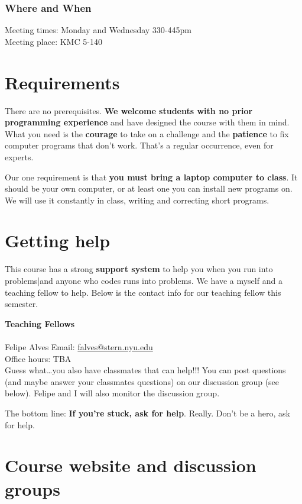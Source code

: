 \subsubsection*{Where and When}
Meeting times: Monday and Wednesday 330-445pm\\

Meeting place: KMC 5-140

\section*{Requirements}

There are no prerequisites.
{\bf We welcome students with no prior programming experience\/}
and have designed the course with them in mind.
What you need is the {\bf courage\/} to take on a challenge
and the {\bf patience\/} to fix computer programs that don't work.
That's a regular occurrence, even for experts.

Our one requirement is that {\bf you must bring a laptop computer to class\/}.
It should be your own computer, or at least one you can install new programs on.
We will use it constantly in class, writing and correcting short programs.


\section*{Getting help}

This course has a strong {\bf support system\/} to help you when you run into problems|and anyone who codes runs into problems. We have a myself and a teaching fellow to help. Below is the contact info for our teaching fellow this semester.

\textbf{Teaching Fellows}\\
\\
Felipe Alves 
Email: \href{mailto:mailto:falves@stern.nyu.edu}{falves@stern.nyu.edu}\\
Office hours: TBA\\

Guess what\ldots you also have classmates that can help!!! You can post questions (and maybe answer your classmates questions) on our discussion group (see below). Felipe and I will also monitor the discussion group.

The bottom line:  {\bf If you're stuck, ask for help\/}.
Really.  Don't be a hero, ask for help.



\section*{Course website and discussion groups}

